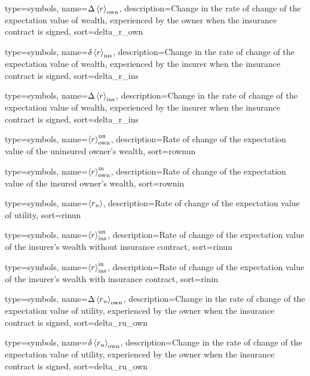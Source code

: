 {
 type={symbols}, 
 name={\ensuremath{\Delta \ave{r}_{\text{own}}}},
 description={Change in the rate of change of the expectation value of wealth, experienced by the owner when the insurance contract is signed},
 sort=delta_r_own
}

{
 type={symbols}, 
 name={\ensuremath{\delta \ave{r}_{\text{ins}}}},
 description={Change in the rate of change of the expectation value of wealth, experienced by the insurer when the insurance contract is signed},
 sort=delta_r_ins
}

{
 type={symbols}, 
 name={\ensuremath{\Delta \ave{r}_{\text{ins}}}},
 description={Change in the rate of change of the expectation value of wealth, experienced by the insurer when the insurance contract is signed},
 sort=delta_r_ins
}

{
  type={symbols}, 
  name={\ensuremath{\ave{r}_{\text{own}}^{\text{un}}}},
  description={Rate of change of the expectation value of the uninsured owner's wealth},
  sort=rownun
}

{
  type={symbols}, 
  name={\ensuremath{\ave{r}_{\text{own}}^{\text{in}}}},
  description={Rate of change of the expectation value of the insured owner's wealth},
  sort=rownin
}

{
  type={symbols}, 
  name={\ensuremath{\ave{r_u}}},
  description={Rate of change of the expectation value of utility},
  sort=rinun
}

{
  type={symbols}, 
  name={\ensuremath{\ave{r}_{\text{ins}}^{\text{un}}}},
  description={Rate of change of the expectation value of the insurer's wealth without insurance contract},
  sort=rinun
}

{
  type={symbols}, 
  name={\ensuremath{\ave{r}_{\text{ins}}^{\text{in}}}},
  description={Rate of change of the expectation value of the insurer's wealth with insurance contract},
  sort=rinin
}






{
 type={symbols}, 
 name={\ensuremath{\Delta \ave{r_u}_{\text{own}}}},
 description={Change in the rate of change of the expectation value of utility, experienced by the owner when the insurance contract is signed},
 sort=delta_ru_own
}

{
 type={symbols}, 
 name={\ensuremath{\delta \ave{r_u}_{\text{own}}}},
 description={Change in the rate of change of the expectation value of utility, experienced by the owner when the insurance contract is signed},
 sort=delta_ru_own
}

